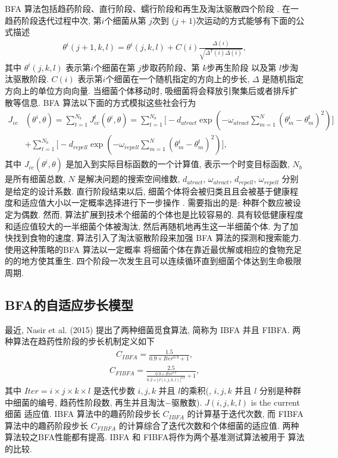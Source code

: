 BFA 算法包括趋药阶段、直行阶段、蠕行阶段和再生及淘汰驱散四个阶段 . 在一趋药阶段迭代过程中次, 第$i$个细菌从第 $j$次到  ($j+1$)次运动的方式能够有下面的公式描述
\begin{align}\label{AdapchemCI}
    \theta^{i}(j+1,k,l)=\theta^{i}(j,k,l)+C(i)\frac{\Delta(i)}{\sqrt{\Delta^{T}(i)\Delta(i)}},
\end{align}
其中 $\theta^{i}(j,k,l)$ 表示第$i$个细菌在第 $j$步取药阶段、第 $k$步再生阶段 以及第 $l$步淘汰驱散阶段. $C(i)$ 表示第$i$个细菌在一个随机指定的方向上的步长, $\Delta$ 是随机指定方向上的单位方向向量. 当细菌个体移动时, 吸细菌将会释放引聚集后或者排斥扩散等信息. BFA 算法以下面的方式模拟这些社会行为
\begin{align}
    J_{cc}&(\theta^{i}, \theta)=\sum_{t=1}^{N_b}J_{cc}^{t}(\theta^{i},\theta)
= \sum_{t=1}^{N_b}\Big[-d_{atract}\exp(-\omega_{atract}\sum_{m=1}^{N}(\theta_{m}^{i}-\theta_{m}^{t})^2)\Big] \\
&+\sum_{t=1}^{N_b}\Big[-d_{repell}\exp(-\omega_{repell}\sum_{m=1}^{N}(\theta_{m}^{i}-\theta_{m}^{t})^2)\Big],
\end{align}
其中 $J_{cc}(\theta^i,\theta)$ 是加入到实际目标函数的一个计算值, 表示一个时变目标函数, $N_b$ 是所有细菌总数, $N$ 是解决问题的搜索空间维数, $d_{atract}$, $\omega_{atract}$, $d_{repell}$, $\omega_{repell}$ 分别是给定的设计系数. 直行阶段结束以后, 细菌个体将会被归类且且会被基于健康程度和适应值大小以一定概率选择进行下一步操作 . 需要指出的是: 种群个数应被设定为偶数. 然而, 算法扩展到技术个细菌的个体也是比较容易的. 具有较低健康程度和适应值较大的一半细菌个体被淘汰, 然后再随机地再生这一半细菌个体. 为了加快找到食物的速度, 算法引入了淘汰驱散阶段来加强 BFA 算法的探测和搜索能力. 使用这种策略的BFA 算法以一定概率 将细菌个体在靠近最优解或相应的食物充足的的地方使其重生. 四个阶段一次发生且可以连续循环直到细菌个体达到生命极限周期.
\subsection{BFA的自适应步长模型}
最近, Nasir et al. (2015) 提出了两种细菌觅食算法, 简称为 IBFA 并且 FIBFA. 两种算法在趋药性阶段的步长机制定义如下
\begin{align}\label{AdapchemCIBFA}
    C_{IBFA}=\frac {1.5} {0.9\times Iter^{0.9}+1},
\end{align}
\begin{align}\label{AdapchemCF}
     C_{FIBFA}= \frac {2.5} {\frac{0.9\times Iter^{0.9}}{0.2\times|J(i,j,k,l)|^{0.2}}+1},
\end{align}
其中 $Iter=i\times j\times k\times l$ 是迭代步数 $i, j, k$ 并且 $l$的乘积(, $i, j, k$ 并且 $l$ 分别是种群中细菌的编号, 趋药性阶段数, 再生并且淘汰$-$驱散数). $J(i, j, k, l)$ is the current 细菌 适应值. IBFA 算法中的趣药阶段步长 $C_{IBFA}$ 的计算基于迭代次数, 而 FIBFA算法中的趣药阶段步长 $C_{FIBFA}$ 的计算综合了迭代次数和个体细菌的适应值. 两种算法较之BFA性能都有提高. IBFA 和 FIBFA将作为两个基准测试算法被用于 算法的比较.
